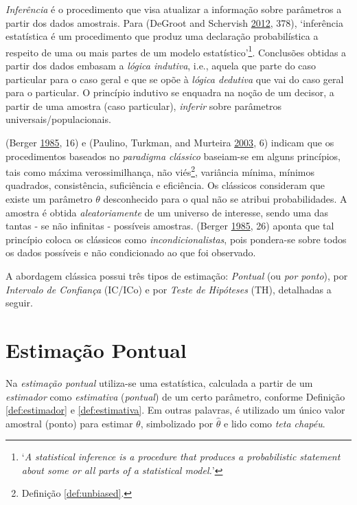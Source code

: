 \documentclass[
]{book}
\theoremstyle{definition}
\theoremstyle{definition}
\theoremstyle{definition}
\theoremstyle{remark}
\begin{document}
\emph{Inferência} é o procedimento que visa atualizar a informação sobre parâmetros a partir dos dados amostrais. Para (DeGroot and Schervish \protect\hyperlink{ref-degroot2012probability}{2012}, 378), `inferência estatística é um procedimento que produz uma declaração probabilística a respeito de uma ou mais partes de um modelo estatístico'\footnote{`\emph{A statistical inference is a procedure that produces a probabilistic statement about some or all parts of a statistical model.}'}. Conclusões obtidas a partir dos dados embasam a \emph{lógica indutiva}, i.e., aquela que parte do caso particular para o caso geral e que se opõe à \emph{lógica dedutiva} que vai do caso geral para o particular. O princípio indutivo se enquadra na noção de um decisor, a partir de uma amostra (caso particular), \emph{inferir} sobre parâmetros universais/populacionais.

(Berger \protect\hyperlink{ref-berger1985statistical}{1985}, 16) e (Paulino, Turkman, and Murteira \protect\hyperlink{ref-paulino2003estatistica}{2003}, 6) indicam que os procedimentos baseados no \emph{paradigma clássico} baseiam-se em alguns princípios, tais como máxima verossimilhança, não viés\footnote{Definição \ref{def:unbiased}.}, variância mínima, mínimos quadrados, consistência, suficiência e eficiência. Os clássicos consideram que existe um parâmetro \(\theta\) desconhecido para o qual não se atribui probabilidades. A amostra é obtida \emph{aleatoriamente} de um universo de interesse, sendo uma das tantas - se não infinitas - possíveis amostras. (Berger \protect\hyperlink{ref-berger1985statistical}{1985}, 26) aponta que tal princípio coloca os clássicos como \emph{incondicionalistas}, pois pondera-se sobre todos os dados possíveis e não condicionado ao que foi observado.

A abordagem clássica possui três tipos de estimação: \emph{Pontual} (ou \emph{por ponto}), por \emph{Intervalo de Confiança} (IC/ICo) e por \emph{Teste de Hipóteses} (TH), detalhadas a seguir.

\hypertarget{estimauxe7uxe3o-pontual}{%
\section{Estimação Pontual}\label{estimauxe7uxe3o-pontual}}

Na \emph{estimação pontual} utiliza-se uma estatística, calculada a partir de um \emph{estimador} como \emph{estimativa} (\emph{pontual}) de um certo parâmetro, conforme Definição \ref{def:estimador} e \ref{def:estimativa}. Em outras palavras, é utilizado um único valor amostral (ponto) para estimar \(\theta\), simbolizado por \(\hat{\theta}\) e lido como \emph{teta chapéu}.
\end{document}
